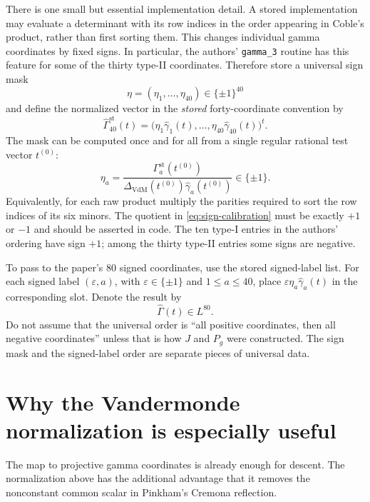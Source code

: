 \documentclass[11pt]{article}
\newcommand{\Gamhat}{\widehat{\Gamma}}
\newcommand{\gamhat}{\widehat{\gamma}}
\newcommand{\Deltav}{\Delta_{\mathrm{VdM}}}
\begin{document}
There is one small but essential implementation detail.  A stored implementation
may evaluate a determinant with its row indices in the order appearing in Coble's
product, rather than first sorting them.  This changes individual gamma coordinates
by fixed signs.  In particular, the authors' \texttt{gamma\_3} routine has this
feature for some of the thirty type-II coordinates.  Therefore store a universal
sign mask
\[
  \eta=(\eta_1,\ldots,\eta_{40})\in\{\pm1\}^{40}
\]
and define the normalized vector in the \emph{stored} forty-coordinate convention by
\begin{equation}
  \Gamhat^{\mathrm{st}}_{40}(t)
  =\bigl(\eta_1\gamhat_1(t),\ldots,
          \eta_{40}\gamhat_{40}(t)\bigr)^t.
  \label{eq:stored-sign-mask}
\end{equation}
The mask can be computed once and for all from a single regular rational test vector
$t^{(0)}$:
\begin{equation}
  \eta_a=
  \frac{\Gamma^{\mathrm{st}}_a(t^{(0)})}
       {\Deltav(t^{(0)})\gamhat_a(t^{(0)})}\in\{\pm1\}.
  \label{eq:sign-calibration}
\end{equation}
Equivalently, for each raw product multiply the parities required to sort the row
indices of its six minors.  The quotient in \eqref{eq:sign-calibration} must be
exactly $+1$ or $-1$ and should be asserted in code.  The ten type-I entries in the
authors' ordering have sign $+1$; among the thirty type-II entries some signs are
negative.

To pass to the paper's $80$ signed coordinates, use the stored signed-label list.
For each signed label $(\varepsilon,a)$, with $\varepsilon\in\{\pm1\}$ and
$1\leq a\leq40$, place
$\varepsilon\eta_a\gamhat_a(t)$ in the corresponding slot.  Denote the result by
\[
  \Gamhat(t)\in L^{80}.
\]
Do not assume that the universal order is ``all positive coordinates, then all
negative coordinates'' unless that is how $J$ and $P_g$ were constructed.  The
sign mask and the signed-label order are separate pieces of universal data.

\section{Why the Vandermonde normalization is especially useful}
\label{sec:exact-equivariance}

The map to projective gamma coordinates is already enough for descent.  The
normalization above has the additional advantage that it removes the nonconstant
common scalar in Pinkham's Cremona reflection.
\end{document}
